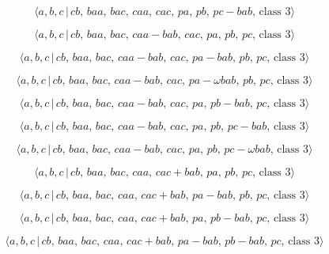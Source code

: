 \documentclass[10pt]{article}
\begin{document}
\begin{equation}
\langle a,b,c\,|\,cb,\,baa,\,bac,\,caa,\,cac,\,pa,\,pb,\,pc-bab,\,\text{
class }3\rangle  \tag{6.237}
\end{equation}

\begin{equation}
\langle a,b,c\,|\,cb,\,baa,\,bac,\,caa-bab,\,cac,\,pa,\,pb,\,pc,\,\text{
class }3\rangle  \tag{6.238}
\end{equation}

\begin{equation}
\langle a,b,c\,|\,cb,\,baa,\,bac,\,caa-bab,\,cac,\,pa-bab,\,pb,\,pc,\,\text{
class }3\rangle  \tag{6.239}
\end{equation}

\begin{equation}
\langle a,b,c\,|\,cb,\,baa,\,bac,\,caa-bab,\,cac,\,pa-\omega bab,\,pb,\,pc,\,%
\text{class }3\rangle  \tag{6.240}
\end{equation}

\begin{equation}
\langle a,b,c\,|\,cb,\,baa,\,bac,\,caa-bab,\,cac,\,pa,\,pb-bab,\,pc,\,\text{
class }3\rangle  \tag{6.241}
\end{equation}

\begin{equation}
\langle a,b,c\,|\,cb,\,baa,\,bac,\,caa-bab,\,cac,\,pa,\,pb,\,pc-bab,\,\text{
class }3\rangle  \tag{6.242}
\end{equation}

\begin{equation}
\langle a,b,c\,|\,cb,\,baa,\,bac,\,caa-bab,\,cac,\,pa,\,pb,\,pc-\omega bab,\,%
\text{class }3\rangle  \tag{6.243}
\end{equation}

\begin{equation}
\langle a,b,c\,|\,cb,\,baa,\,bac,\,caa,\,cac+bab,\,pa,\,pb,\,pc,\,\text{
class }3\rangle  \tag{6.244}
\end{equation}

\begin{equation}
\langle a,b,c\,|\,cb,\,baa,\,bac,\,caa,\,cac+bab,\,pa-bab,\,pb,\,pc,\,\text{
class }3\rangle  \tag{6.245}
\end{equation}

\begin{equation}
\langle a,b,c\,|\,cb,\,baa,\,bac,\,caa,\,cac+bab,\,pa,\,pb-bab,\,pc,\,\text{
class }3\rangle  \tag{6.246}
\end{equation}

\begin{equation}
\langle a,b,c\,|\,cb,\,baa,\,bac,\,caa,\,cac+bab,\,pa-bab,\,pb-bab,\,pc,\,%
\text{class }3\rangle  \tag{6.247}
\end{equation}
\end{document}
